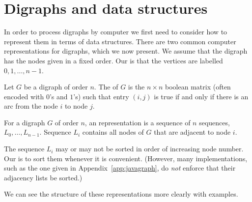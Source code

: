 \section{Digraphs and data structures}\label{sec:graph-reps}

In order to process digraphs by computer we first need to consider how
to represent them in terms of data structures. There are two common
computer representations for digraphs, which we now present. We assume
that the digraph has the nodes given in a fixed order. Our
 is that the vertices are labelled $0, 1, \dots, n - 1$.

\begin{Definition}
Let $G$ be a digraph of order $n$. The  of $G$
is the $n\times n$ boolean matrix (often encoded with $0$'s and $1$'s)
such that entry $(i,j)$ is true if and only if there is an arc from the
node $i$ to node $j$.
\end{Definition}

\begin{Definition}
For a digraph $G$ of order $n$, an 
representation is a sequence of $n$ sequences, $L_0, \dots, L_{n-1}$. 
Sequence $L_i$  contains all nodes of $G$ that are adjacent to node $i$.
\end{Definition}

The sequence $L_i$ may or may not be sorted in order of increasing node number. 
Our  is to sort them whenever it is convenient.
(However, many implementations, such as the one given in
Appendix~\ref{app:javagraph}, do \emph{not} enforce that their 
adjacency lists be sorted.)

We can see the structure of these representations more clearly with
examples.

